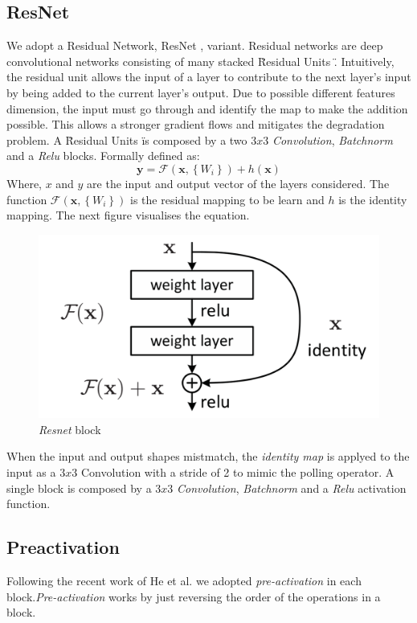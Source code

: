 \documentclass[../document.tex]{subfiles}
\begin{document}
\subsection{ResNet}
We adopt a Residual Network, ResNet \cite{he2015deep}, variant. Residual networks are deep convolutional networks consisting of many stacked \" Residual Units \". Intuitively, the residual unit allows the input of a layer to contribute to the next layer's input by being added to the current layer's output. Due to possible different features dimension, the input must go through and identify the map to make the addition possible. This allows a stronger gradient flows and mitigates the degradation problem. A \"Residual Units \" is composed by a two $3x3$ \emph{Convolution}, \emph{Batchnorm} \cite{ioffe2015batch} and a \emph{Relu} blocks. Formally defined as: 
\begin{equation}
    \mathbf{y}=\mathcal{F}\left(\mathbf{x},\left\{W_{i}\right\}\right)+h(\mathbf{x})
    \label{eq : resnet}
\end{equation}
Where, $x$ and $y$ are the input and output vector of the layers considered. The function $\mathcal{F}\left(\mathbf{x},\left\{W_{i}\right\}\right)$ is the residual mapping to be learn and $h$ is the identity mapping. The next figure visualises the equation.
\begin{figure}[htbp]
    \centering
    \includegraphics[scale=0.3]{../img/implementation/estimator/resnet_block.png}
    \caption{\emph{Resnet} block \cite{he2015deep}}
\end{figure}
When the input and output shapes mistmatch, the \emph{identity map} is applyed to the input as a $3x3$ Convolution with a stride of 2 to mimic the polling operator. A single block is composed by a $3x3$ \emph{Convolution}, \emph{Batchnorm} and a \emph{Relu} activation function. 
\subsection{Preactivation}
Following the recent work of He et al. \cite{he2015identity} we adopted \emph{pre-activation} in each block.\emph{Pre-activation} works by just reversing the order of the operations in a block.
\end{document}
